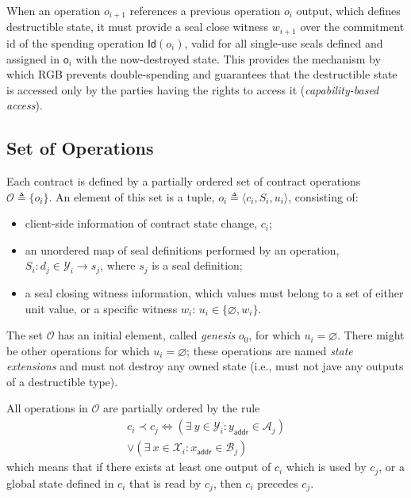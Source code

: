 \documentclass[9pt,oneside]{amsart}
\begin{document}
\begin{multicols}{2}
When an operation $o_{i+1}$ references a previous operation $o_i$ output,
which defines destructible state, it must provide a \gls{seal close witness} $w_{i+1}$
over the commitment id of the spending operation $\mathsf{Id}(o_i)$,
valid for all single-use seals defined and assigned in $\mathsf{o}_i$
with the now-destroyed state.
This provides the mechanism by which RGB prevents double-spending
and guarantees that the destructible state is accessed only by the parties
having the rights to access it (\emph{capability-based access}).

\subsection{Set of Operations}

Each contract is defined by a partially ordered set of contract operations
$\mathcal{O} \triangleq \{ o_i \}$.
An element of this set is a tuple, $o_i \triangleq \langle c_i, S_i, u_i \rangle$, consisting of:
\begin{itemize}
\item client-side information of contract state change, $c_i$;
\item an unordered map of seal definitions performed by an operation, 
  $S_i: d_j \in \mathcal{Y}_i \rightarrow s_j$, where $s_j$ is a seal definition;
\item a seal closing witness information, 
  which values must belong to a set of either unit value, or a specific witness $w_i$: 
  $u_i \in \{ \varnothing, w_i \}$.
\end{itemize}

The set $\mathcal{O}$ has an initial element, called \emph{genesis} $o_0$, for which $u_i = \varnothing$.
There might be other operations for which $u_i = \varnothing$;
these operations are named \emph{state extensions} and must not destroy any owned state
(i.e., must not jave any outputs of a destructible type).

All operations in $\mathcal{O}$ are partially ordered by the rule
\noindent
\begin{equation}
\begin{split}
c_i \prec c_j \Longleftrightarrow (\exists \ y \in \mathcal{Y}_i: y_\mathsf{addr} \in \mathcal{A}_j) \\
\vee (\exists \ x \in \mathcal{X}_i: x_\mathsf{addr} \in \mathcal{B}_j)
\end{split}
\end{equation}
\noindent
which means that if there exists at least one output of $c_i$ which is used by $c_j$, or a global
state defined in $c_i$ that is read by $c_j$, then $c_i$ precedes $c_j$.


\end{multicols}
\end{document}
